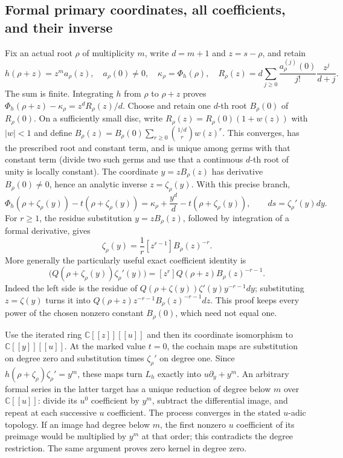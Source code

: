 \documentclass[11pt,a4paper]{article}
\theoremstyle{definition}
\begin{document}
\subsection{Formal primary coordinates, all coefficients, and their inverse}
Fix an actual root $\rho$ of multiplicity $m$, write $d=m+1$ and
$z=s-\rho$, and retain
\begin{equation}
 h(\rho+z)=z^m a_\rho(z),\quad a_\rho(0)\ne0,
 \quad \kappa_\rho=\Phi_h(\rho),\quad
 R_\rho(z)=d\sum_{j\geq0}\frac{a_\rho^{(j)}(0)}{j!}
                         \frac{z^j}{d+j}.             \tag{IAL6}
\end{equation}
The sum is finite.  Integrating $h$ from $\rho$ to $\rho+z$ proves
$\Phi_h(\rho+z)-\kappa_\rho=z^dR_\rho(z)/d$.
Choose and retain one $d$-th root $B_\rho(0)$ of $R_\rho(0)$.
On a sufficiently small disc, write $R_\rho(z)=R_\rho(0)(1+w(z))$
with $|w|<1$ and define
$B_\rho(z)=B_\rho(0)\sum_{r\geq0}{1/d\choose r}w(z)^r$.
This converges, has the prescribed root and constant term, and is unique
among germs with that constant term (divide two such germs and use that
a continuous $d$-th root of unity is locally constant).  The coordinate
$y=zB_\rho(z)$ has derivative $B_\rho(0)\ne0$, hence an analytic inverse
$z=\zeta_\rho(y)$.  With this precise branch,
\begin{equation}
 \Phi_h(\rho+\zeta_\rho(y))-t(\rho+\zeta_\rho(y))
 =\kappa_\rho+\frac{y^d}{d}-t(\rho+\zeta_\rho(y)),
 \qquad ds=\zeta_\rho'(y)dy.                         \tag{IAL7}
\end{equation}
For $r\geq1$, the residue substitution $y=zB_\rho(z)$, followed by
integration of a formal derivative, gives
\begin{equation}
 [y^r]\zeta_\rho(y)=\frac1r[z^{r-1}]B_\rho(z)^{-r}.
                                                        \tag{IAL8}
\end{equation}
More generally the particularly useful exact coefficient identity is
\begin{equation}
 [y^r]\bigl(Q(\rho+\zeta_\rho(y))\zeta_\rho'(y)\bigr)
   =[z^r]Q(\rho+z)B_\rho(z)^{-r-1}.                  \tag{IAL9}
\end{equation}
Indeed the left side is the residue of
$Q(\rho+\zeta(y))\zeta'(y)y^{-r-1}dy$; substituting $z=\zeta(y)$
turns it into $Q(\rho+z)z^{-r-1}B_\rho(z)^{-r-1}dz$.
This proof keeps every power of the chosen nonzero constant
$B_\rho(0)$, which need not equal one.

Use the iterated ring $\mathbb C[[z]][[u]]$ and then its coordinate
isomorphism to $\mathbb C[[y]][[u]]$.  At the marked value $t=0$, the
cochain maps are substitution on degree zero and substitution times
$\zeta_\rho'$ on degree one.  Since
$h(\rho+\zeta_\rho)\zeta_\rho'=y^m$, these maps turn $L_h$ exactly into
$u\partial_y+y^m$.  An arbitrary formal series in the latter target
has a unique reduction of degree below $m$ over $\mathbb C[[u]]$:
divide its $u^0$ coefficient by $y^m$, subtract the differential image,
and repeat at each successive $u$ coefficient.  The process converges
in the stated $u$-adic topology.  If an image had degree below $m$,
the first nonzero $u$ coefficient of its preimage would be multiplied
by $y^m$ at that order; this contradicts the degree restriction.  The
same argument proves zero kernel in degree zero.
\end{document}
